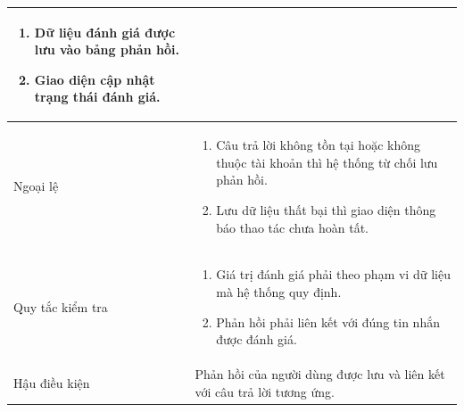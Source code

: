 \documentclass[12pt,a4paper,oneside]{report}
\begin{document}
{\begin{longtable}{|L{3.6cm}|L{11.2cm}|}
\begin{enumerate}[leftmargin=*,nosep]
                            \item Dữ liệu đánh giá được lưu vào bảng phản hồi.
                            \item Giao diện cập nhật trạng thái đánh giá.
                          \end{enumerate}                         \\
    \hline
    Ngoại lệ            & \begin{enumerate}[leftmargin=*,nosep]
                            \item Câu trả lời không tồn tại hoặc không thuộc tài khoản thì hệ thống từ chối lưu phản hồi.
                            \item Lưu dữ liệu thất bại thì giao diện thông báo thao tác chưa hoàn tất.
                          \end{enumerate}    \\
    \hline
    Quy tắc kiểm tra    & \begin{enumerate}[leftmargin=*,nosep]
                            \item Giá trị đánh giá phải theo phạm vi dữ liệu mà hệ thống quy định.
                            \item Phản hồi phải liên kết với đúng tin nhắn được đánh giá.
                          \end{enumerate}                           \\
    \hline
    Hậu điều kiện       & Phản hồi của người dùng được lưu và liên kết với câu trả lời tương ứng.                         \\
    \hline
  \end{longtable}
}
\end{document}
